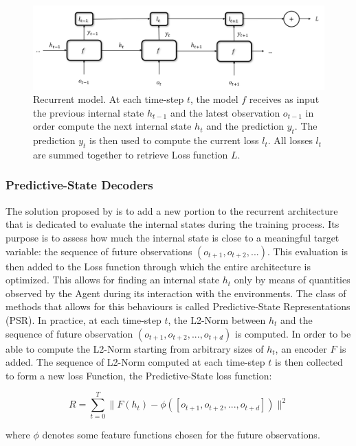                 \begin{figure}[t]
                    \centering
                    \includegraphics[width=15cm, keepaspectratio]{images/pomdp/pomdp_rnn.png}
                    \caption{Recurrent model. At each time-step $t$, the model $f$ receives as input the previous internal state $h_{t-1}$ and the latest observation $o_{t-1}$ in order compute the next internal state $h_{t}$ and the prediction $y_{t}$. The prediction $y_t$ is then used to compute the current loss $l_t$. All losses $l_t$ are summed together to retrieve Loss function $L$.}
                    \label{fig:pomdp_rnn}
                \end{figure}
                
            \subsubsection{Predictive-State Decoders}
                The solution proposed by  is to add a new portion to the recurrent architecture that is dedicated to evaluate the internal states during the training process. Its purpose is to assess how much the internal state is close to a meaningful target variable: the sequence of future observations $(o_{t+1}, o_{t+2}, ...)$. This evaluation is then added to the Loss function through which the entire architecture is optimized. This allows for finding an internal state $h_t$ only by means of quantities observed by the Agent during its interaction with the environments. The class of methods that allows for this behaviours is called Predictive-State Representations (PSR). \newline
                In practice, at each time-step $t$, the L2-Norm between $h_t$ and the sequence of future observation $(o_{t+1}, o_{t+2}, ..., o_{t+d})$ is computed. In order to be able to compute the L2-Norm starting from arbitrary sizes of $h_t$, an encoder $F$ is added. The sequence of L2-Norm computed at each time-step $t$ is then collected to form a new loss Function, the Predictive-State loss function:
                
                \begin{definition}
                    \[ R = \sum_{t=0}^{T} \| F(h_t) - \phi([o_{t+1}, o_{t+2}, ..., o_{t+d}])\|^{2}\]
                    
                    where $\phi$ denotes some feature functions chosen for the future observations.
                \end{definition}
                
